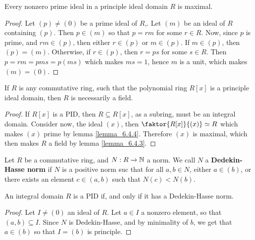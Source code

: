 \begin{lemma}\label{lemma_6.6.2}
  Every nonzero prime ideal in a principle ideal domain $R$ is maximal.
\end{lemma}
\begin{proof}
  Let $(p) \neq (0)$ be a prime ideal of $R$,. Let $(m)$ be an ideal of $R$
  containing $(p)$. Then $p \in (m)$ so that $p=rm$ for some  $r \in R$. Now,
  since $p$ is prime, and $rm \in (p)$, then either $r \in (p)$ or $m \in
  (p)$. If $m \in (p)$, then $(p)=(m)$. Otherwise, if $r \in (p)$, then $r=ps$
  for some  $s \in R$. Then  $p=rm=pms=p(ms)$ which makes $ms=1$, hence $m$ is
  a unit, which makes $(m)=(0)$.
\end{proof}
\begin{corollary}
  If $R$ is any commutative ring, such that the polynomial ring $R[x]$ is a
  principle ideal domain, then $R$ is necessarily a field.
\end{corollary}
\begin{proof}
  If $R[x]$ is a PID, then $R \subseteq R[x]$, as a subring, must be an
  integral domain. Consider now, the ideal $(x)$, then $\faktor{R[x]}{(x)}
  \simeq R$ which makes $(x)$ prime by lemma \ref{lemma_6.4.4}. Therefore $(x)$ is
  maximal, which then makes $R$ a field by lemma \ref{lemma_6.4.3}.
\end{proof}

\begin{definition}
  Let $R$ be a commutative ring, and  $N:R \xrightarrow{} \mathbb{N}$ a norm. We call
  $N$ a \textbf{Dedekin-Hasse norm} if $N$ is a positive norm suc that for
  all $a,b \in N$, either $a \in (b)$, or there exists an element $c \in
  (a,b)$ such that $N(c)<N(b)$.
\end{definition}

\begin{lemma}\label{lemma_6.6.3}
  An integral domain $R$ is a PID if, and only if it has a Dedekin-Hasse norm.
\end{lemma}
\begin{proof}
  Let $I \neq (0)$ an ideal of $R$. Let $a \in I$ a nonzero element, so that
  $(a,b) \subseteq I$. Since $N$ is Dedekin-Hasse, and by minimality of $b$,
  we get that $a \in (b)$ so that $I=(b)$ is principle.
\end{proof}

